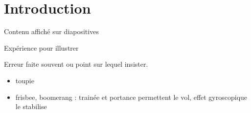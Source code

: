 


\biblio{}

\section*{Introduction}

\begin{ecran}
	Contenu affiché sur diapositives
\end{ecran}






\begin{experience}
	Expérience pour illustrer
\end{experience}

\begin{attention}
	Erreur faite souvent ou point sur lequel insister.
\end{attention}


\begin{remarques}
 \begin{itemize}
  \item toupie
  \item frisbee, boomerang : trainée et portance permettent le vol, effet gyroscopique le stabilise
 \end{itemize}	
\end{remarques}